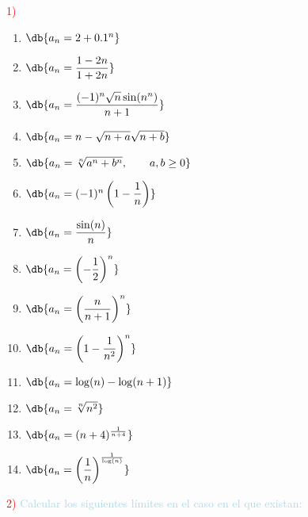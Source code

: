 

\textcolor{red}{1) }
\begin{enumerate}[label=\color{red}\alph*)]
    \item $\db{a_n=2+0.1^n}$
    \item $\db{a_n=\dfrac{1-2n}{1+2n}}$
    \item $\db{a_n=\dfrac{(-1)^n\sqrt{n}\sin(n^n)}{n+1}}$
    \item $\db{a_n=n-\sqrt{n+a}\sqrt{n+b}}$
    \item $\db{a_n=\sqrt[n]{a^n+b^n},\qquad a,b\ge0}$
    \item $\db{a_n=(-1)^n\left(1-\dfrac{1}{n}\right)}$
    \item $\db{a_n=\dfrac{\sin(n)}{n}}$
    \item $\db{a_n=\left(-\dfrac{1}{2}\right)^n}$
    \item $\db{a_n=\left(\dfrac{n}{n+1}\right)^n}$
    \item $\db{a_n=\left(1-\dfrac{1}{n^2}\right)^n}$
    \item $\db{a_n=\log(n)-\log(n+1)}$
    \item $\db{a_n=\sqrt[n]{n^2}}$
    \item $\db{a_n=(n+4)^{\frac{1}{n+4}}}$
    \item $\db{a_n=\left(\dfrac{1}{n}\right)^{\frac{1}{\log(n)}}}$
\end{enumerate}

\textcolor{red}{2)} \textcolor{lightblue}{Calcular los siguientes límites en el caso en el que existan:}

